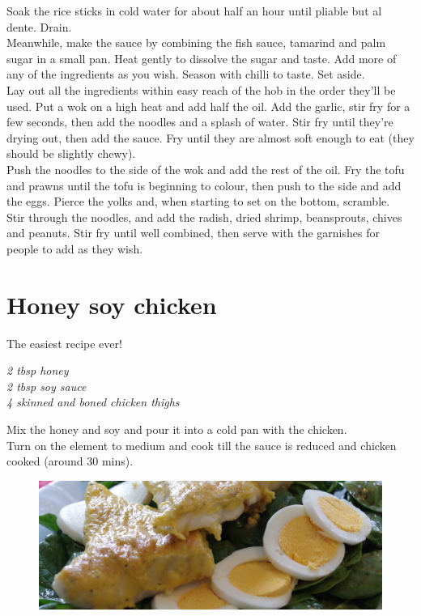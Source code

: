 \documentclass{tufte-book}
\begin{document}
\smallskip
Soak the rice sticks in cold water for about half an hour until pliable but al dente. Drain.
\\Meanwhile, make the sauce by combining the fish sauce, tamarind and palm sugar in a small pan. Heat gently to dissolve the sugar and taste. Add more of any of the ingredients as you wish. Season with chilli to taste. Set aside.
\\Lay out all the ingredients within easy reach of the hob in the order they'll be used. Put a wok on a high heat and add half the oil. Add the garlic, stir fry for a few seconds, then add the noodles and a splash of water. Stir fry until they're drying out, then add the sauce. Fry until they are almost soft enough to eat (they should be slightly chewy).
\\Push the noodles to the side of the wok and add the rest of the oil. Fry the tofu and prawns until the tofu is beginning to colour, then push to the side and add the eggs. Pierce the yolks and, when starting to set on the bottom, scramble.
\\Stir through the noodles, and add the radish, dried shrimp, beansprouts, chives and peanuts. Stir fry until well combined, then serve with the garnishes for people to add as they wish.

\newpage


\section{Honey soy chicken}

The easiest recipe ever!

\smallskip
\emph{2 tbsp honey
\\2 tbsp soy sauce
\\4 skinned and boned chicken thighs}

\smallskip
Mix the honey and soy and pour it into a cold pan with the chicken.
\\Turn on the element to medium and cook till the sauce is reduced and chicken cooked (around 30 mins).

\newpage


\begin{figure}[h]
  \includegraphics[width=\linewidth]{fleurs.JPG}%
\end{figure}
\end{document}

